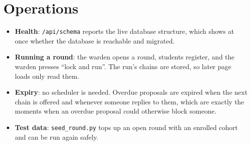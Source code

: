 \section{Operations}

\begin{itemize}
  \item \textbf{Health}: \texttt{/api/schema} reports the live database
  structure, which shows at once whether the database is reachable and
  migrated.
  \item \textbf{Running a round}: the warden opens a round, students
  register, and the warden presses ``lock and run''. The run's chains are
  stored, so later page loads only read them.
  \item \textbf{Expiry}: no scheduler is needed. Overdue proposals are
  expired when the next chain is offered and whenever someone replies
  to them, which are exactly the moments when an overdue proposal could
  otherwise block someone.
  \item \textbf{Test data}: \texttt{seed\_round.py} tops up an open round
  with an enrolled cohort and can be run again safely.
\end{itemize}
